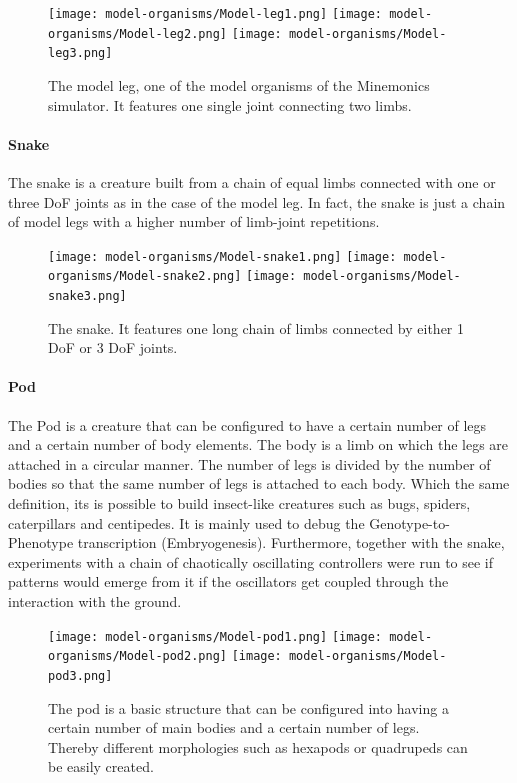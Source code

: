\documentclass[main]{subfiles}
\begin{document}
\begin{figure}[H]
\centering
\texttt{[image: model-organisms/Model-leg1.png]}
\texttt{[image: model-organisms/Model-leg2.png]}
\texttt{[image: model-organisms/Model-leg3.png]}
\caption[The model leg]{The model leg, one of the model organisms of the Minemonics simulator. It features one single joint connecting two limbs.}
\label{figure:model-leg}
\end{figure}

\paragraph{Snake}

The snake is a creature built from a chain of equal limbs connected with one or three DoF joints as in the case of the model leg. %
%
In fact, the snake is just a chain of model legs with a higher number of limb-joint repetitions. 

\begin{figure}[H]
\centering
\texttt{[image: model-organisms/Model-snake1.png]}
\texttt{[image: model-organisms/Model-snake2.png]}
\texttt{[image: model-organisms/Model-snake3.png]}
\caption[The snake]{The snake. It features one long chain of limbs connected by either 1 DoF or 3 DoF joints.}
\label{figure:snake}
\end{figure}

\paragraph{Pod}

The Pod is a creature that can be configured to have a certain number of legs and a certain number of body elements. %
%
The body is a limb on which the legs are attached in a circular manner. %
%
The number of legs is divided by the number of bodies so that the same number of legs is attached to each body. %
%
Which the same definition, its is possible to build insect-like creatures such as bugs, spiders, caterpillars and centipedes. %
%
It is mainly used to debug the Genotype-to-Phenotype transcription (Embryogenesis). %
%
Furthermore, together with the snake, experiments with a chain of chaotically oscillating controllers were run to see if patterns would emerge from it if the oscillators get coupled through the interaction with the ground.

\begin{figure}[H]
\centering
\texttt{[image: model-organisms/Model-pod1.png]}
\texttt{[image: model-organisms/Model-pod2.png]}
\texttt{[image: model-organisms/Model-pod3.png]}
\caption[The pod]{The pod is a basic structure that can be configured into having a certain number of main bodies and a certain number of legs. Thereby different morphologies such as hexapods or quadrupeds can be easily created.}
\label{figure:pod}
\end{figure}
\end{document}
